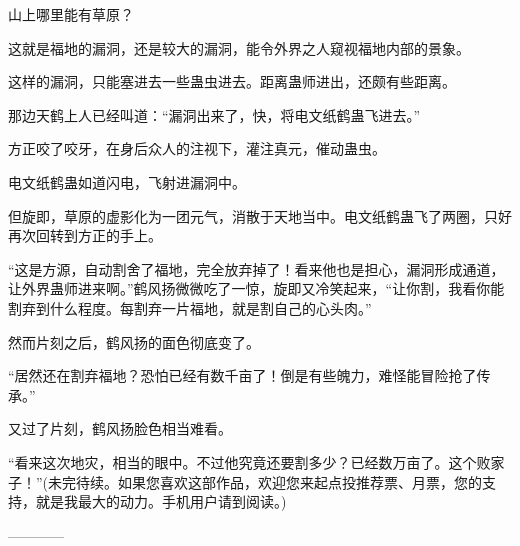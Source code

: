 \begin{this_body}
山上哪里能有草原？

这就是福地的漏洞，还是较大的漏洞，能令外界之人窥视福地内部的景象。

这样的漏洞，只能塞进去一些蛊虫进去。距离蛊师进出，还颇有些距离。

那边天鹤上人已经叫道：“漏洞出来了，快，将电文纸鹤蛊飞进去。”

方正咬了咬牙，在身后众人的注视下，灌注真元，催动蛊虫。

电文纸鹤蛊如道闪电，飞射进漏洞中。

但旋即，草原的虚影化为一团元气，消散于天地当中。电文纸鹤蛊飞了两圈，只好再次回转到方正的手上。

“这是方源，自动割舍了福地，完全放弃掉了！看来他也是担心，漏洞形成通道，让外界蛊师进来啊。”鹤风扬微微吃了一惊，旋即又冷笑起来，“让你割，我看你能割弃到什么程度。每割弃一片福地，就是割自己的心头肉。”

然而片刻之后，鹤风扬的面色彻底变了。

“居然还在割弃福地？恐怕已经有数千亩了！倒是有些魄力，难怪能冒险抢了传承。”

又过了片刻，鹤风扬脸色相当难看。

“看来这次地灾，相当的眼中。不过他究竟还要割多少？已经数万亩了。这个败家子！”(未完待续。如果您喜欢这部作品，欢迎您来起点投推荐票、月票，您的支持，就是我最大的动力。手机用户请到阅读。)

------------

\end{this_body}

